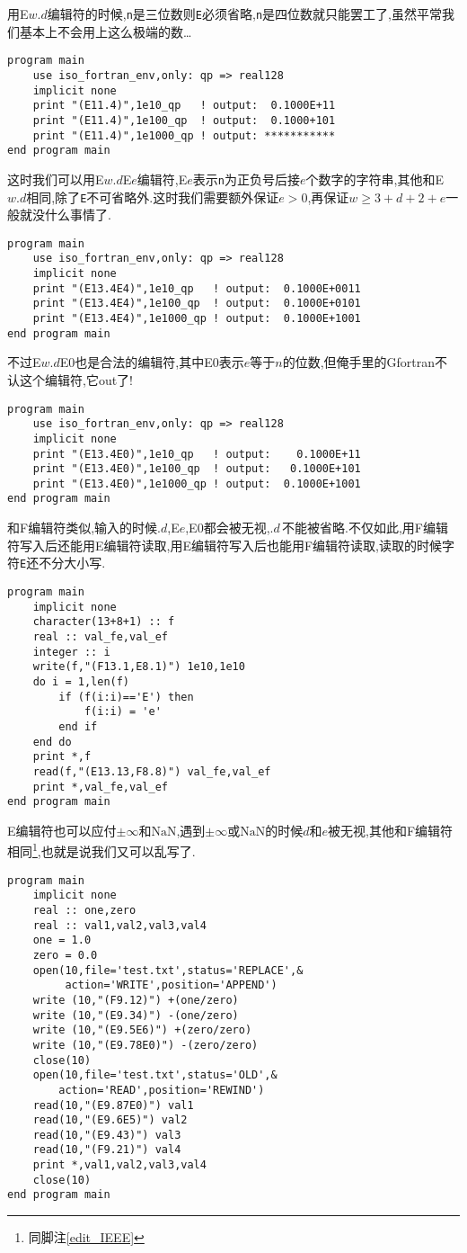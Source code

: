 用E$w.d$编辑符的时候,\texttt{n}是三位数则\texttt{E}必须省略,\texttt{n}是四位数就只能罢工了,虽然平常我们基本上不会用上这么极端的数\dots
\begin{lstlisting}
program main
    use iso_fortran_env,only: qp => real128
    implicit none
    print "(E11.4)",1e10_qp   ! output:  0.1000E+11
    print "(E11.4)",1e100_qp  ! output:  0.1000+101
    print "(E11.4)",1e1000_qp ! output: ***********
end program main
\end{lstlisting}
这时我们可以用E$w.d$E$e$编辑符,E$e$表示\texttt{n}为正负号后接$e$个数字的字符串,其他和E$w.d$相同,除了\texttt{E}不可省略外.这时我们需要额外保证$e>0$,再保证$w\geqslant 3+d+2+e$一般就没什么事情了.
\begin{lstlisting}
program main
    use iso_fortran_env,only: qp => real128
    implicit none
    print "(E13.4E4)",1e10_qp   ! output:  0.1000E+0011
    print "(E13.4E4)",1e100_qp  ! output:  0.1000E+0101
    print "(E13.4E4)",1e1000_qp ! output:  0.1000E+1001
end program main
\end{lstlisting}
不过E$w.d$E0也是合法的编辑符,其中E0表示$e$等于$n$的位数,但俺手里的Gfortran不认这个编辑符,它out了!
\begin{lstlisting}
program main
    use iso_fortran_env,only: qp => real128
    implicit none
    print "(E13.4E0)",1e10_qp   ! output:    0.1000E+11
    print "(E13.4E0)",1e100_qp  ! output:   0.1000E+101
    print "(E13.4E0)",1e1000_qp ! output:  0.1000E+1001
end program main
\end{lstlisting}

和F编辑符类似,输入的时候$.d$,E$e$,E0都会被无视,$.d\,$不能被省略.不仅如此,用F编辑符写入后还能用E编辑符读取,用E编辑符写入后也能用F编辑符读取,读取的时候字符\texttt{E}还不分大小写.
\begin{lstlisting}
program main
    implicit none
    character(13+8+1) :: f
    real :: val_fe,val_ef
    integer :: i
    write(f,"(F13.1,E8.1)") 1e10,1e10
    do i = 1,len(f)
        if (f(i:i)=='E') then
            f(i:i) = 'e'
        end if
    end do
    print *,f
    read(f,"(E13.13,F8.8)") val_fe,val_ef
    print *,val_fe,val_ef
end program main
\end{lstlisting}

E编辑符也可以应付$\pm\infty$和$\text{NaN}$,遇到$\pm\infty$或$\text{NaN}$的时候$d$和$e$被无视,其他和F编辑符相同\footnote{同脚注\ref{edit_IEEE}},也就是说我们又可以乱写了.
\begin{lstlisting}
program main
    implicit none
    real :: one,zero
    real :: val1,val2,val3,val4
    one = 1.0
    zero = 0.0
    open(10,file='test.txt',status='REPLACE',&
         action='WRITE',position='APPEND')
    write (10,"(F9.12)") +(one/zero)
    write (10,"(E9.34)") -(one/zero)
    write (10,"(E9.5E6)") +(zero/zero)
    write (10,"(E9.78E0)") -(zero/zero)
    close(10)
    open(10,file='test.txt',status='OLD',&
        action='READ',position='REWIND')
    read(10,"(E9.87E0)") val1
    read(10,"(E9.6E5)") val2
    read(10,"(E9.43)") val3
    read(10,"(F9.21)") val4
    print *,val1,val2,val3,val4
    close(10)
end program main
\end{lstlisting}

